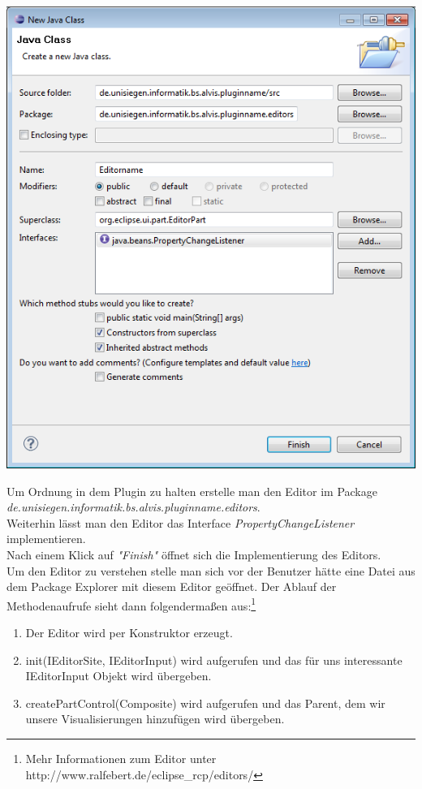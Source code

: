 \documentclass[10pt,a4paper]{article}
\begin{document}
\begin{center}
\includegraphics[scale=0.485]{images/new_plugin_editor_01}
\end{center}

Um Ordnung in dem Plugin zu halten erstelle man den Editor im Package \emph{de.unisiegen.informatik.bs.alvis.pluginname.editors}.\\
Weiterhin lässt man den Editor das Interface \emph{PropertyChangeListener} implementieren.\\
Nach einem Klick auf \emph{"Finish"} öffnet sich die Implementierung des Editors. \\



Um den Editor zu verstehen stelle man sich vor der Benutzer hätte eine Datei aus dem Package Explorer mit diesem Editor geöffnet. Der Ablauf der Methodenaufrufe sieht dann folgendermaßen aus:\footnote{Mehr Informationen zum Editor unter http://www.ralfebert.de/eclipse\_rcp/editors/}
\begin{enumerate}
\item Der Editor wird per Konstruktor erzeugt.
\item init(IEditorSite, IEditorInput) wird aufgerufen und das für uns interessante IEditorInput Objekt wird übergeben. 
\item createPartControl(Composite) wird aufgerufen und das Parent, dem wir unsere Visualisierungen hinzufügen wird übergeben.
\end{enumerate}
\end{document}
